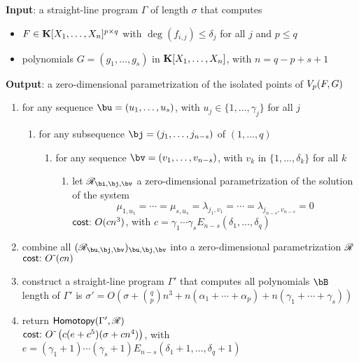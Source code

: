 \documentclass[12pt]{article}
\begin{document}
\begin{algorithm}
\caption{$\mathsf{ColumnDegree}(\Gamma)$}
{\bf Input}: a straight-line program $\Gamma$ of length $\sigma$ that computes 
\begin{itemize}  
\setlength\itemsep{0em}
\item $F \in \mathbf{K}[X_1, \ldots, X_n]^{p \times q}$ with $\deg(f_{i,j}) \leq \delta_j$ for all $j$ and $p \le q$
\item polynomials $G = (g_1, \ldots, g_s)$ in $\mathbf{K}[X_1, \ldots, X_n]$, with $n=q-p+s+1$
\end{itemize}
{\bf Output}: a zero-dimensional parametrization of the isolated points of $V_{p}({F},G)$
\begin{enumerate}\setlength\itemsep{0em}
\item for any sequence $\bu=(u_1,\dots,u_s)$, with $u_j \in \{1,\dots,\gamma_j\}$ for all $j$
\begin{enumerate}\setlength\itemsep{0em}
\item for any subsequence $\bj=(j_1,\dots,j_{n-s})$ of $(1,\dots,q)$
\begin{enumerate}\setlength\itemsep{0em}
\item for any sequence $\bv=(v_1,\dots,v_{n-s})$, with $v_k$ in $\{1,\dots,\delta_k\}$ for all $k$
\begin{enumerate}\setlength\itemsep{0em}
 \item let $\scrR_{\bi,\bj,\bv}$ a zero-dimensional parametrization of the solution of the system 
$$\mu_{1,u_1}=\cdots=\mu_{s,u_s}=\lambda_{j_1,v_1}=\cdots=\lambda_{j_{n-s},v_{n-s}}=0$$
$\text{\sf{cost:~}} O(cn^3)$, with $c=\gamma_1\cdots\gamma_s E_{n-s}(\delta_1,\dots,\delta_q)$
\end{enumerate}
\end{enumerate}
\end{enumerate}
\item combine all $(\scrR_{\bu,\bj,\bv})_{\bu,\bj,\bv}$ into a zero-dimensional parametrization $\mathscr{R}$\\
$\text{\sf{cost:~}} {O}{\,\tilde{ }\,}(cn)$

\item construct a straight-line program $\Gamma'$ that computes all polynomials $\bB$\\
  length of $\Gamma'$ is $\sigma'=O(\sigma + {q \choose p} n^3 + n
(\alpha_1+\cdots+\alpha_p) + n(\gamma_1 + \cdots + \gamma_s))$

\item return $\mathsf{Homotopy}(\Gamma',\mathscr{R})$ \\
$\text{\sf{cost:~}} {O}{\,\tilde{ }\,}\left (c(e+c^5 )(\sigma + cn^4)\right)$, 
with $e=(\gamma_1+1)\cdots(\gamma_s+1) E_{n-s}(\delta_1+1,\dots,\delta_q+1)$
\end{enumerate}
\label{ColHom}
\end{algorithm}
\end{document}
